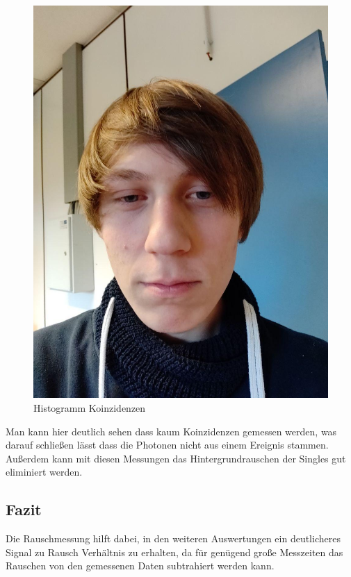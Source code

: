\documentclass[12pt,twoside,a4paper]{scrartcl}
\begin{document}
\begin{figure}[H]
\begin{minipage}{0.49 \textwidth}
					\includegraphics[width=\textwidth]{Pictures/Platzhalter.jpg}
						\caption{Histogramm Koinzidenzen}
				\end{minipage}
		\end{figure}

		Man kann hier deutlich sehen dass kaum Koinzidenzen gemessen werden, was darauf schließen lässt dass die Photonen nicht aus einem Ereignis stammen.
		Außerdem kann mit diesen Messungen das Hintergrundrauschen der Singles gut eliminiert werden.

		\subsection{Fazit}

		Die Rauschmessung hilft dabei, in den weiteren Auswertungen ein deutlicheres Signal zu Rausch Verhältnis zu erhalten, da für genügend große Messzeiten das Rauschen von den gemessenen Daten subtrahiert werden kann.
\end{document}
